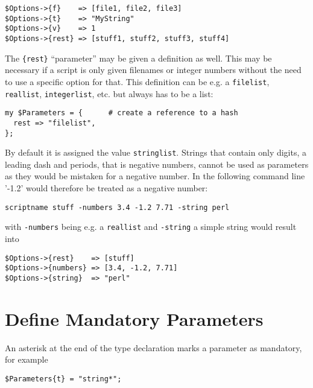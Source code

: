 \documentclass[12pt, a4paper]{article}
\begin{document}
\begin{verbatim}
$Options->{f}    => [file1, file2, file3]
$Options->{t}    => "MyString"
$Options->{v}    => 1
$Options->{rest} => [stuff1, stuff2, stuff3, stuff4]
\end{verbatim}

The \verb'{rest}' ``parameter'' may be given a definition as well. This may be necessary if a script is only given filenames or integer numbers without the need to use a specific option for that. This definition can be e.g. a \verb'filelist', \verb'reallist', \verb'integerlist', etc. but always has to be a list: 

\begin{verbatim}
my $Parameters = {      # create a reference to a hash
  rest => "filelist",
};
\end{verbatim}

By default it is assigned the value \verb'stringlist'. Strings that contain only digits, a leading dash and periods, that is negative numbers, cannot be used as parameters as they would be mistaken for a negative number. In the following command line '-1.2' would therefore be treated as a negative number:

\begin{verbatim}
scriptname stuff -numbers 3.4 -1.2 7.71 -string perl 
\end{verbatim}

with \verb'-numbers' being e.g. a \verb'reallist' and \verb'-string' a simple string would result into

\begin{verbatim}
$Options->{rest}    => [stuff]
$Options->{numbers} => [3.4, -1.2, 7.71]
$Options->{string}  => "perl"
\end{verbatim}




\section{Define Mandatory Parameters}

An asterisk at the end of the type declaration marks a parameter as mandatory, for example

\begin{verbatim}
$Parameters{t} = "string*";
\end{verbatim}

\end{document}
